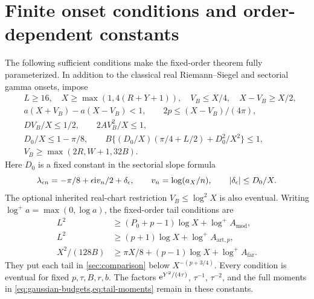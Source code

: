 \section{Finite onset conditions and order-dependent constants}
\label{app:onsets}
The following sufficient conditions make the fixed-order theorem
fully parameterized. In addition to the classical real
Riemann--Siegel and sectorial gamma onsets, impose
\begin{subequations}\label{eq:structural-gates}
\begin{align}
 &L\ge16,\quad X\ge\max(1,4(R+Y+1)),\quad V_B\le X/4,\quad
                         X-V_B\ge X/2,\\
 &a(X+V_B)-a(X-V_B)<1,\qquad
                       2p\le (X-V_B)/(4\pi),\\
 &DV_B/X\le1/2,\qquad 2AV_B^2/X\le1,\\
 &D_0/X\le1-\pi/8,\qquad
 B\{(D_0/X)(\pi/4+L/2)+D_0^2/X^2\}\le1,\\
 &V_B\ge\max(2R,W+1,32B).
\end{align}
\end{subequations}
Here \(D_0\) is a fixed constant in the sectorial slope formula
\[
 \lambda_{\epsilon n}=-\pi/8+\epsilon\mathrm i v_n/2+\delta_\epsilon,
 \qquad
 v_n=\log(a_X/n),\qquad \lvert \delta_\epsilon\rvert\le D_0/X.
\]
The optional inherited real-chart restriction
\(V_B\le\log^2X\) is also eventual.
Writing \(\log^+a=\max(0,\log a)\), the fixed-order tail
conditions are
\begin{subequations}\label{eq:fixed-tail-gates}
\begin{align}
 L^2&\ge(P_0+p-1)\log X+\log^+ A_{\mathrm{mod}},\\
 L^2&\ge(p+1)\log X+\log^+ A_{\mathrm{art},p},\\
 X^2/(128B)&\ge\pi X/8+(p-1)\log X+\log^+ A_{\mathrm{far}}.
\end{align}
\end{subequations}
They put each tail in \cref{sec:comparison} below
\(X^{-(p+3/4)}\). Every condition is eventual for fixed
\(p,\tau,B,r,b\). The factors
\(\mathrm e^{Y^2/(4\tau)}\), \(\tau^{-1}\), \(\tau^{-2}\),
and the full moments in \cref{eq:gaussian-budgets,eq:tail-moments}
remain in these constants.

